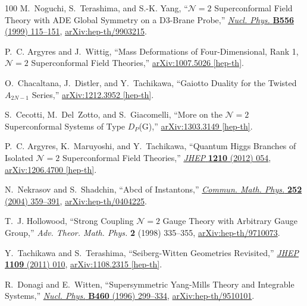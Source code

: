 \begin{thebibliography}{100}
M.~Noguchi, S.~Terashima, and S.-K. Yang, ``{${\mathcal{N}}\!=2$ Superconformal Field Theory with ADE Global Symmetry on a D3-Brane Probe},''
\href{http://dx.doi.org/10.1016/S0550-3213(99)00343-0}{{\em Nucl. Phys.} {\bfseries B556} (1999) 115--151},
\href{http://arxiv.org/abs/hep-th/9903215}{{\ttfamily arXiv:hep-th/9903215}}.

P.~C. Argyres and J.~Wittig, ``{Mass Deformations of Four-Dimensional, Rank 1, ${\mathcal{N}}\!=2$ Superconformal Field Theories},''
\href{http://arxiv.org/abs/1007.5026}{{\ttfamily arXiv:1007.5026 [hep-th]}}.

O.~Chacaltana, J.~Distler, and Y.~Tachikawa, ``{Gaiotto Duality for the Twisted $A_{2N-1}$ Series},''
\href{http://arxiv.org/abs/1212.3952}{{\ttfamily arXiv:1212.3952 [hep-th]}}.

S.~Cecotti, M.~Del~Zotto, and S.~Giacomelli, ``{More on the ${\mathcal{N}}\!=2$ Superconformal Systems of Type $D_P$(G)},''
\href{http://arxiv.org/abs/1303.3149}{{\ttfamily arXiv:1303.3149 [hep-th]}}.

P.~C. Argyres, K.~Maruyoshi, and Y.~Tachikawa, ``{Quantum Higgs Branches of Isolated ${\mathcal{N}}\!=2$ Superconformal Field Theories},''
\href{http://dx.doi.org/10.1007/JHEP10(2012)054}{{\em JHEP} {\bfseries 1210} (2012) 054},
\href{http://arxiv.org/abs/1206.4700}{{\ttfamily arXiv:1206.4700 [hep-th]}}.

N.~Nekrasov and S.~Shadchin, ``{Abcd of Instantons},''
\href{http://dx.doi.org/10.1007/s00220-004-1189-1}{{\em Commun. Math. Phys.} {\bfseries 252} (2004) 359--391},
\href{http://arxiv.org/abs/hep-th/0404225}{{\ttfamily arXiv:hep-th/0404225}}.

T.~J. Hollowood, ``{Strong Coupling ${\mathcal{N}}\!=2$ Gauge Theory with Arbitrary Gauge Group},'' {\em Adv. Theor. Math. Phys.} {\bfseries 2} (1998) 335--355,
\href{http://arxiv.org/abs/hep-th/9710073}{{\ttfamily arXiv:hep-th/9710073}}.

Y.~Tachikawa and S.~Terashima, ``{Seiberg-Witten Geometries Revisited},''
\href{http://dx.doi.org/10.1007/JHEP09(2011)010}{{\em JHEP} {\bfseries 1109} (2011) 010},
\href{http://arxiv.org/abs/1108.2315}{{\ttfamily arXiv:1108.2315 [hep-th]}}.

R.~Donagi and E.~Witten, ``{Supersymmetric Yang-Mills Theory and Integrable Systems},''
\href{http://dx.doi.org/10.1016/0550-3213(95)00609-5}{{\em Nucl. Phys.} {\bfseries B460} (1996) 299--334},
\href{http://arxiv.org/abs/hep-th/9510101}{{\ttfamily arXiv:hep-th/9510101}}.


\end{thebibliography}
